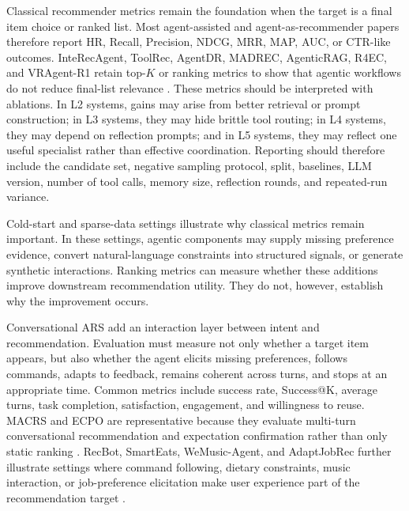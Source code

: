 Classical recommender metrics remain the foundation when the target is a final item choice or ranked list. Most agent-assisted and agent-as-recommender papers therefore report HR, Recall, Precision, NDCG, MRR, MAP, AUC, or CTR-like outcomes. InteRecAgent, ToolRec, AgentDR, MADREC, AgenticRAG, R4EC, and VRAgent-R1 retain top-$K$ or ranking metrics to show that agentic workflows do not reduce final-list relevance \cite{huang2025recommender,zhao2024toolrec,yang2025agentdr,park2025madrec,ma2025agenticrag,chen2025vragent,gu2025r}. These metrics should be interpreted with ablations. In L2 systems, gains may arise from better retrieval or prompt construction; in L3 systems, they may hide brittle tool routing; in L4 systems, they may depend on reflection prompts; and in L5 systems, they may reflect one useful specialist rather than effective coordination. Reporting should therefore include the candidate set, negative sampling protocol, split, baselines, LLM version, number of tool calls, memory size, reflection rounds, and repeated-run variance.



Cold-start and sparse-data settings illustrate why classical metrics remain important. In these settings, agentic components may supply missing preference evidence, convert natural-language constraints into structured signals, or generate synthetic interactions. Ranking metrics can measure whether these additions improve downstream recommendation utility. They do not, however, establish why the improvement occurs. 


Conversational ARS add an interaction layer between intent and recommendation. Evaluation must measure not only whether a target item appears, but also whether the agent elicits missing preferences, follows commands, adapts to feedback, remains coherent across turns, and stops at an appropriate time. Common metrics include success rate, Success@K, average turns, task completion, satisfaction, engagement, and willingness to reuse. MACRS and ECPO are representative because they evaluate multi-turn conversational recommendation and expectation confirmation rather than only static ranking \cite{fang2024multi,feng2025expectation}. RecBot, SmartEats, WeMusic-Agent, and AdaptJobRec further illustrate settings where command following, dietary constraints, music interaction, or job-preference elicitation make user experience part of the recommendation target \cite{tang2025interactive,liang2025smarteats,wang2025adaptjobrec, haller2026impress}.

